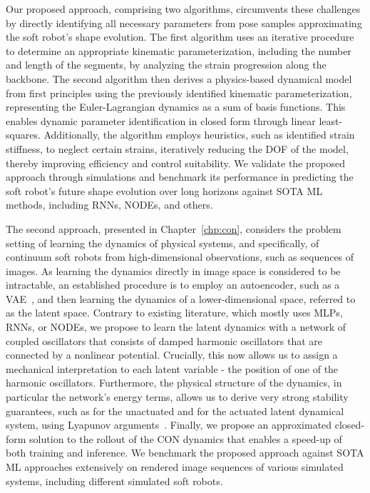 Our proposed approach, comprising two algorithms, circumvents these challenges by directly identifying all necessary parameters from pose samples approximating the soft robot’s shape evolution.
The first algorithm uses an iterative procedure to determine an appropriate kinematic parameterization, including the number and length of the segments, by analyzing the strain progression along the backbone.
The second algorithm then derives a physics-based dynamical model from first principles using the previously identified kinematic parameterization, representing the Euler-Lagrangian dynamics as a sum of basis functions. This enables dynamic parameter identification in closed form through linear least-squares.
Additionally, the algorithm employs heuristics, such as identified strain stiffness, to neglect certain strains, iteratively reducing the \gls{DOF} of the model, thereby improving efficiency and control suitability.
We validate the proposed approach through simulations and benchmark its performance in predicting the soft robot’s future shape evolution over long horizons against \gls{SOTA} \gls{ML} methods, including \glspl{RNN}, \glspl{NODE}, and others.

The second approach, presented in Chapter~\ref{chp:con}, considers the problem setting of learning the dynamics of physical systems, and specifically, of continuum soft robots from high-dimensional observations, such as sequences of images.
As learning the dynamics directly in image space is considered to be intractable, an established procedure is to employ an autoencoder, such as a \gls{VAE}~\citep{kingma2014auto}, and then learning the dynamics of a lower-dimensional space, referred to as the latent space.
Contrary to existing literature, which mostly uses \glspl{MLP}, \glspl{RNN}, or \glspl{NODE}, we propose to learn the latent dynamics with a network of coupled oscillators that consists of damped harmonic oscillators that are connected by a nonlinear potential.
Crucially, this now allows us to assign a mechanical interpretation to each latent variable - the position of one of the harmonic oscillators.
Furthermore, the physical structure of the  dynamics, in particular the network's energy terms, allows us to derive very strong stability guarantees, such as  for the unactuated and  for the actuated latent dynamical system, using Lyapunov arguments~\citep{khalil2002nonlinear}.
Finally, we propose an approximated closed-form solution to the rollout of the \gls{CON} dynamics that enables a speed-up of both training and inference.
We benchmark the proposed approach against \gls{SOTA} \gls{ML} approaches extensively on rendered image sequences of various simulated systems, including different simulated soft robots.


